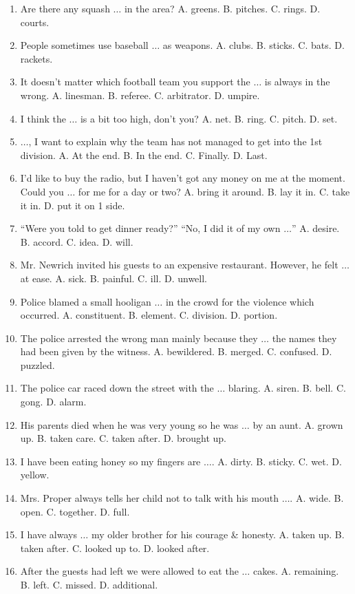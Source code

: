 \documentclass{article}
\numberwithin{equation}{section}
\begin{document}
\begin{enumerate}[leftmargin=2mm]
	\item Are there any squash $\ldots$ in the area? A. greens. B. pitches. C. rings. D. courts.
	\item People sometimes use baseball $\ldots$ as weapons. A. clubs. B. sticks. C. bats. D. rackets.
	\item It doesn't matter which football team you support the $\ldots$ is always in the wrong. A. linesman. B. referee. C. arbitrator. D. umpire.
	\item I think the $\ldots$ is a bit too high, don't you? A. net. B. ring. C. pitch. D. set.
	\item $\ldots$, I want to explain why the team has not managed to get into the 1st division. A. At the end. B. In the end. C. Finally. D. Last.
	\item I'd like to buy the radio, but I haven't got any money on me at the moment. Could you $\ldots$ for me for a day or two? A. bring it around. B. lay it in. C. take it in. D. put it on 1 side.
	\item ``Were you told to get dinner ready?'' ``No, I did it of my own $\ldots$'' A. desire. B. accord. C. idea. D. will.
	\item Mr. Newrich invited his guests to an expensive restaurant. However, he felt $\ldots$ at ease. A. sick. B. painful. C. ill. D. unwell.
	\item Police blamed a small hooligan $\ldots$ in the crowd for the violence which occurred. A. constituent. B. element. C. division. D. portion.
	\item The police arrested the wrong man mainly because they $\ldots$ the names they had been given by the witness. A. bewildered. B. merged. C. confused. D. puzzled.
	\item The police car raced down the street with the $\ldots$ blaring. A. siren. B. bell. C. gong. D. alarm.
	\item His parents died when he was very young so he was $\ldots$ by an aunt. A. grown up. B. taken care. C. taken after. D. brought up.
	\item I have been eating honey so my fingers are $\ldots$. A. dirty. B. sticky. C. wet. D. yellow.
	\item Mrs. Proper always tells her child not to talk with his mouth $\ldots$. A. wide. B. open. C. together. D. full.
	\item I have always $\ldots$ my older brother for his courage \& honesty. A. taken up. B. taken after. C. looked up to. D. looked after.
	\item After the guests had left we were allowed to eat the $\ldots$ cakes. A. remaining. B. left. C. missed. D. additional.

\end{enumerate}
\end{document}
